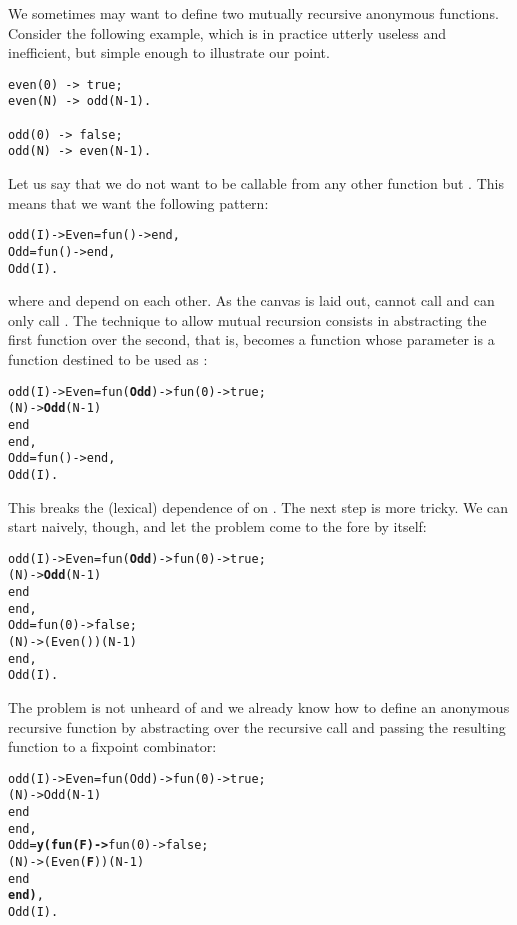 We sometimes may want to define two mutually recursive anonymous
functions. Consider the following example, which is in practice
utterly useless and inefficient, but simple enough to illustrate our
point.
\begin{verbatim}
even(0) -> true;
even(N) -> odd(N-1).

odd(0) -> false;
odd(N) -> even(N-1).
\end{verbatim}
Let us say that we do not want  to be callable from
any other function but . This means that we want the
following pattern:
\begin{alltt}
odd(I) -> Even = fun() ->  end,
          Odd  = fun() ->  end,
          Odd(I).
\end{alltt}
where  and  depend on each other. As the
canvas is laid out,  cannot call  and
 can only call . The technique to allow
mutual recursion consists in abstracting the first function over the
second, that is,  becomes a function whose parameter is
a function destined to be used as :
\begin{alltt}
odd(I) -> Even = fun(\textbf{Odd}) -> fun(0) -> true;
                                (N) -> \textbf{Odd}(N-1)
                             end
                 end,
          Odd  = fun() ->  end,
          Odd(I).
\end{alltt}
This breaks the (lexical) dependence of  on
. The next step is more tricky. We can start naively,
though, and let the problem come to the fore by itself:
\begin{alltt}
odd(I) -> Even = fun(\textbf{Odd}) -> fun(0) -> true;
                                (N) -> \textbf{Odd}(N-1)
                             end
                 end,
          Odd  = fun(0) -> false;
                    (N) -> (Even())(N-1)
                 end,
          Odd(I).
\end{alltt}
The problem is not unheard of and we already know how to define an
anonymous recursive function by abstracting over the recursive call
and passing the resulting function to a fixpoint combinator:
\begin{alltt}
odd(I) -> Even = fun(Odd) -> fun(0) -> true;
                                (N) -> Odd(N-1)
                             end
                 end,
          Odd  = \textbf{y(fun(F) ->} fun(0) -> false;
                                (N) -> (Even(\textbf{F}))(N-1)
                             end
                   \textbf{end)},
          Odd(I).
\end{alltt}

